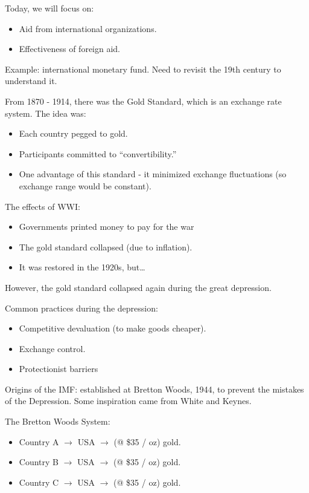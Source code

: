\documentclass{article}
\begin{document}
Today, we will focus on:

\begin{itemize}
  \item Aid from international organizations.
  \item Effectiveness of foreign aid.
\end{itemize}

Example: international monetary fund.  Need to revisit the 19th century to understand it.

From 1870 - 1914, there was the Gold Standard, which is an exchange rate system.  The idea was:

\begin{itemize}
  \item Each country pegged to gold.
  \item Participants committed to ``convertibility.''
  \item One advantage of this standard - it minimized exchange fluctuations (so exchange range would be constant).
\end{itemize}

The effects of WWI:
\begin{itemize}
  \item Governments printed money to pay for the war
  \item The gold standard collapsed (due to inflation).
  \item It was restored in the 1920s, but\ldots
\end{itemize}

However, the gold standard collapsed again during the great depression.

Common practices during the depression:
\begin{itemize}
  \item Competitive devaluation (to make goods cheaper).
  \item Exchange control.
  \item Protectionist barriers
\end{itemize}

Origins of the IMF: established at Bretton Woods, 1944, to prevent the mistakes of the Depression.  Some inspiration came from White and Keynes.

The Bretton Woods System:
\begin{itemize}
  \item Country A $\to$ USA $\to$ (@ \$35 / oz) gold.
  \item Country B $\to$ USA $\to$ (@ \$35 / oz) gold.
  \item Country C $\to$ USA $\to$ (@ \$35 / oz) gold.
\end{itemize}
\end{document}
